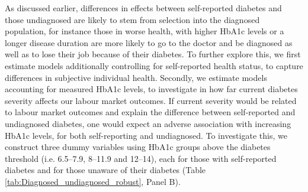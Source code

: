 As discussed earlier, differences in effects between self-reported diabetes and those undiagnosed are likely to stem from selection into the diagnosed population, for instance those in worse health, with higher \ac{HbA1c} levels or a longer disease duration are more likely to go to the doctor and be diagnosed as well as to lose their job because of their diabetes. To further explore this, we first estimate models additionally controlling for self-reported health status, to capture differences in subjective individual health. Secondly, we estimate models accounting for measured \ac{HbA1c} levels, to  investigate in how far current diabetes severity affects our labour market outcomes. If current severity would be related to labour market outcomes and explain the difference between self-reported and undiagnosed diabetes, one would expect an adverse association with increasing \ac{HbA1c} levels, for both self-reporting and undiagnosed. To investigate this, we construct three dummy variables using \ac{HbA1c} groups above the diabetes threshold (i.e. 6.5--7.9, 8--11.9 and 12--14), each for those with self-reported diabetes and for those unaware of their diabetes (Table \ref{tab:Diagnosed_undiagnosed_robust}, Panel B).

